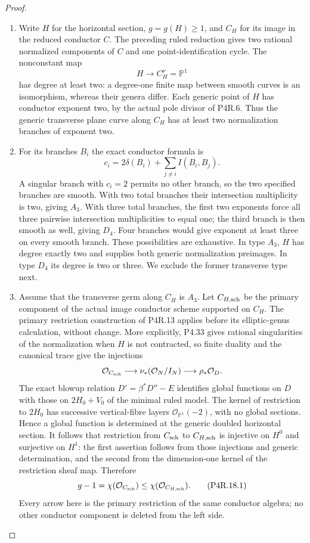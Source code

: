 \begin{proof}

\begin{enumerate}[label={$\langle1\rangle$\arabic*.},leftmargin=*]
\item Write $H$ for the horizontal section, $g=g(H)\ge1$, and
$C_H$ for its image in the reduced conductor $C$. The preceding
ruled reduction gives two rational normalized components of $C$
and one point-identification cycle. The nonconstant map
\[
                         H\longrightarrow C_H^\nu=\mathbb P^1
\]
has degree at least two: a degree-one finite map between smooth
curves is an isomorphism, whereas their genera differ. Each
generic point of $H$ has conductor exponent two, by the actual
pole divisor of P4R.6. Thus the generic transverse plane curve
along $C_H$ has at least two normalization branches of exponent two.

\item For its branches $B_i$ the exact conductor formula is
\[
             c_i=2\delta(B_i)+\sum_{j\ne i}I(B_i,B_j).
\]
A singular branch with $c_i=2$ permits no other branch,
so the two specified branches are smooth. With two total
branches their intersection multiplicity is two, giving $A_3$.
With three total branches, the first two exponents force all
three pairwise intersection multiplicities to equal one;
the third branch is then smooth as well, giving $D_4$.
Four branches would give exponent at least three on every
smooth branch. These possibilities are exhaustive. In type
$A_3$, $H$ has degree exactly two and supplies both generic
normalization preimages. In type $D_4$ its degree is two or
three. We exclude the former transverse type next.

\item Assume that the transverse germ along $C_H$ is $A_3$.
Let $C_{H,\rm sch}$ be the primary component of the actual
image conductor scheme supported on $C_H$. The primary
restriction construction of P4R.13 applies before its
elliptic-genus calculation, without change. More explicitly,
P4.33 gives rational singularities of the normalization when
$H$ is not contracted, so finite duality and the canonical
trace give the injections
\[
 \mathcal O_{C_{\rm sch}}\longrightarrow
 \nu_*(\mathcal O_N/I_N)\longrightarrow\rho_*\mathcal O_D.
\]
The exact blowup relation $D'=\beta^*D''-E$ identifies
global functions on $D$ with those on $2H_0+V_0$ of the
minimal ruled model. The kernel of restriction to $2H_0$
has successive vertical-fibre layers
$\mathcal O_{\mathbb P^1}(-2)$, with no global sections.
Hence a global function is determined at the generic doubled
horizontal section. It follows that restriction from
$C_{\rm sch}$ to $C_{H,\rm sch}$ is injective on $H^0$
and surjective on $H^1$: the first assertion follows from
those injections and generic determination, and the second
from the dimension-one kernel of the restriction sheaf map.
Therefore
\[
                 g-1=\chi(\mathcal O_{C_{\rm sch}})
                    \le\chi(\mathcal O_{C_{H,\rm sch}}).
                                                            \tag{P4R.18.1}
\]
Every arrow here is the primary restriction of the same
conductor algebra; no other conductor component is deleted
from the left side.


\end{enumerate}
\end{proof}
